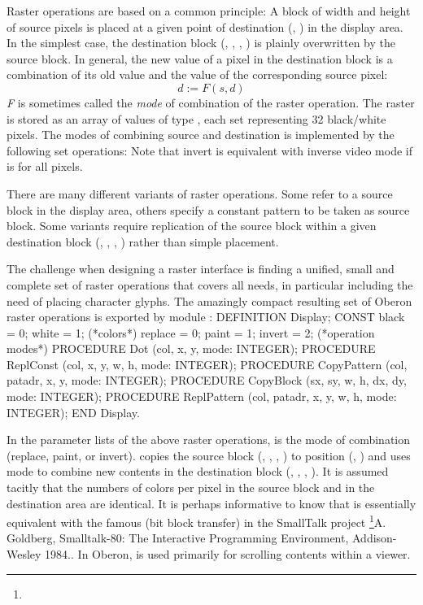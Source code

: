 Raster operations are based on a common principle: A block of width 
and height  of source pixels is placed at a given point of
destination (, ) in the display area. In the simplest case, the
destination block (, , , ) is plainly overwritten by the
source block. In general, the new value of a pixel in the destination
block is a combination of its old value and the value of the
corresponding source pixel:$$d := F(s, d)$$
\emph{F} is sometimes called the \emph{mode} of combination of the
raster operation. The raster is stored as an array of values of type
, each set representing 32 black/white pixels. The modes of
combining source and destination is implemented by the following set
operations:
\medskip
{}\medskip
\noindent Note that invert is equivalent with inverse video mode if  is 
for all pixels.

There are many different variants of raster operations. Some refer to
a source block in the display area, others specify a constant pattern
to be taken as source block. Some variants require replication of the
source block within a given destination block (, , , ) rather
than simple placement.

The challenge when designing a raster interface is finding a unified,
small and complete set of raster operations that covers all needs, in
particular including the need of placing character glyphs. The
amazingly compact resulting set of Oberon raster operations is
exported by module :
\begintt
DEFINITION Display;
  CONST black = 0; white = 1; (*colors*)
        replace = 0; paint = 1; invert = 2; (*operation modes*)
  PROCEDURE Dot (col, x, y, mode: INTEGER);
  PROCEDURE ReplConst (col, x, y, w, h, mode: INTEGER);
  PROCEDURE CopyPattern (col, patadr, x, y, mode: INTEGER);
  PROCEDURE CopyBlock (sx, sy, w, h, dx, dy, mode: INTEGER);
  PROCEDURE ReplPattern (col, patadr, x, y, w, h, mode: INTEGER);
END Display.
\endtt

\noindent In the parameter lists of the above raster operations,  is the mode of combination (replace, paint, or invert).  copies the source block (, , , ) to position (, ) and uses mode to combine new contents in the destination block (, , , ). It is assumed tacitly that the numbers of colors per pixel in the source block and in the destination area are identical. It is perhaps informative to know that  is essentially equivalent with the famous  (bit block transfer) in the SmallTalk project \footnote{{\mc[1]}}{A. Goldberg, Smalltalk-80: The Interactive Programming Environment, Addison-Wesley 1984.}. In Oberon,  is used primarily for scrolling contents within a viewer.

